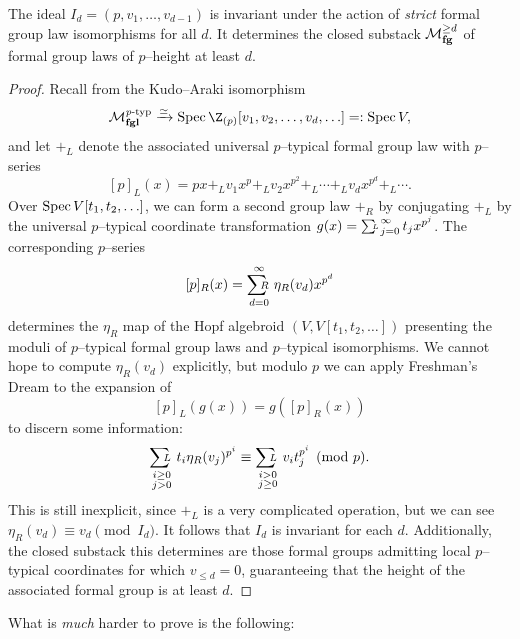 \begin{corollary}\label{IdIsAnInvariantIdeal}
The ideal \(I_d = (p, v_1, \ldots, v_{d-1})\) is invariant under the action of \emph{strict} formal group law isomorphisms for all \(d\).  It determines the closed substack \(\mathcal{M}_{\mathbf{fg}}^{\ge d}\) of formal group laws of \(p\)--height at least \(d\).
\end{corollary}
\begin{proof}
Recall from  the Kudo--Araki isomorphism \[\moduli{fgl}^{\ptyp} \xrightarrow{\simeq} \Spec \Z_{(p)}[v_1, v_2, \ldots, v_d, \ldots] =: \Spec V,\] and let \(+_L\) denote the associated universal \(p\)--typical formal group law with \(p\)--series \[[p]_L(x) = px +_L v_1 x^p +_L v_2 x^{p^2} +_L \cdots +_L v_d x^{p^d} +_L \cdots.\]  Over \(\operatorname{Spec} V[t_1, t_2, \ldots]\), we can form a second group law \(+_R\) by conjugating \(+_L\) by the universal \(p\)--typical coordinate transformation \(g(x) = \sumfgl{L}_{j=0}^\infty t_j x^{p^j}\).  The corresponding \(p\)--series \[[p]_R(x) = \sumfgl{R}_{d=0}^\infty \eta_R(v_d) x^{p^d}\] determines the \(\eta_R\) map of the Hopf algebroid \((V, V[t_1, t_2, \ldots])\) presenting the moduli of \(p\)--typical formal group laws and \(p\)--typical isomorphisms.  We cannot hope to compute \(\eta_R(v_d)\) explicitly, but modulo \(p\) we can apply Freshman's Dream to the expansion of \[[p]_L(g(x)) = g([p]_R(x))\] to discern some information: \[\sumfgl{L}_{\substack{i \ge 0 \\ j > 0}} t_i \eta_R(v_j)^{p^i} \equiv \sumfgl{L}_{\substack{i > 0 \\ j \ge 0}} v_i t_j^{p^i} \pmod p.\]  This is still inexplicit, since \(+_L\) is a very complicated operation, but we can see \(\eta_R(v_d) \equiv v_d \pmod{I_d}\).  It follows that \(I_d\) is invariant for each \(d\).  Additionally, the closed substack this determines are those formal groups admitting local \(p\)--typical coordinates for which \(v_{\le d} = 0\), guaranteeing that the height of the associated formal group is at least \(d\).
\end{proof}

\noindent What is \emph{much} harder to prove is the following:

